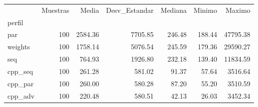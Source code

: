 \begin{tabular}{lrrrrrr}
\toprule
 & Muestras & Media & Desv_Estandar & Mediana & Minimo & Maximo \\
perfil &  &  &  &  &  &  \\
\midrule
par & 100 & 2584.36 & 7705.85 & 246.48 & 188.44 & 47795.38 \\
weights & 100 & 1758.14 & 5076.54 & 245.59 & 179.36 & 29590.27 \\
seq & 100 & 764.93 & 1926.80 & 232.18 & 139.40 & 11834.59 \\
cpp_seq & 100 & 261.28 & 581.02 & 91.37 & 57.64 & 3516.64 \\
cpp_par & 100 & 260.00 & 580.28 & 87.20 & 55.20 & 3510.59 \\
cpp_adv & 100 & 220.48 & 580.51 & 42.13 & 26.03 & 3452.34 \\
\bottomrule
\end{tabular}
